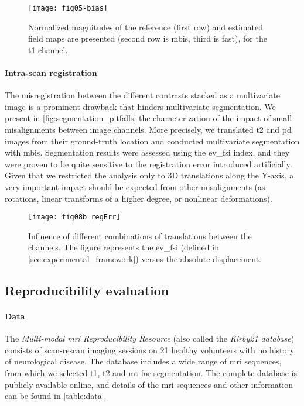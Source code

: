 \begin{figure}
	\centering
	\texttt{[image: fig05-bias]}
	\caption[Comparison of bias estimation]
	{Normalized magnitudes of the reference (first row) and estimated field maps
	are presented (second row is \gls*{mbis}, third is \gls*{fast}),
	for the \gls*{t1} channel.}
	\label{fig:brainweb_results_bias}
\end{figure}

\paragraph{Intra-scan registration} %
The misregistration between the different contrasts stacked as a multivariate image
  is a prominent drawback that hinders multivariate segmentation.
We present in \autoref{fig:segmentation_pitfalls} the characterization of
  the impact of small misalignments between image channels.
More precisely, we translated \gls*{t2} and \gls*{pd} images from their 
  ground-truth location and conducted multivariate segmentation with \gls*{mbis}.
Segmentation results were assessed using the \gls*{ev_fsi} index, and they were
  proven to be quite sensitive to the registration error introduced artificially.
Given that we restricted the analysis only to 3D translations along the Y-axis, a very
  important impact should be expected from other misalignments (as rotations, linear
  transforms of a higher degree, or nonlinear deformations).

\begin{figure}
  	\texttt{[image: fig08b\_regErr]}
    \caption[Intra-subject registration error]{
    	Influence of different combinations of translations
    	between the channels. The figure represents the \acrfull*{ev_fsi}
    	(defined in \autoref{sec:experimental_framework}) versus the absolute
    	displacement.
    	}
    \label{fig:segmentation_pitfalls}
\end{figure}

\subsection{Reproducibility evaluation}
\label{sec:kirby21}
%
\paragraph{Data}
The \emph{Multi-modal \gls*{mri} Reproducibility Resource}
  (also called the \emph{Kirby21 database}) \cite{landman_multi-parametric_2011}
  consists of scan-rescan imaging sessions on 21 healthy volunteers with no history
  of neurological disease.
The database includes a wide range of \gls*{mri} sequences, from which we selected
  \gls*{t1}, \gls*{t2} and \gls*{mt} for segmentation.
The complete database is publicly available online, and details of the \gls*{mri}
  sequences and other information can be found in \autoref{table:data}.

